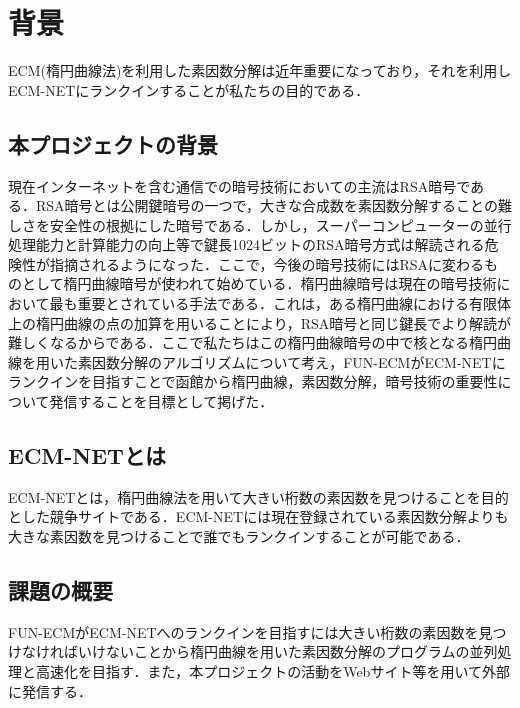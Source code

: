 \documentclass[openany,11pt,papersize]{jsbook}
\begin{document}
\tableofcontents%

\mainmatter%

\chapter{背景}

ECM(楕円曲線法)を利用した素因数分解は近年重要になっており，それを利用しECM-NETにランクインすることが私たちの目的である．


\section{本プロジェクトの背景}

現在インターネットを含む通信での暗号技術においての主流はRSA暗号である．RSA暗号とは公開鍵暗号の一つで，大きな合成数を素因数分解することの難しさを安全性の根拠にした暗号である．しかし，スーパーコンピューターの並行処理能力と計算能力の向上等で鍵長1024ビットのRSA暗号方式は解読される危険性が指摘されるようになった．ここで，今後の暗号技術にはRSAに変わるものとして楕円曲線暗号が使われて始めている．楕円曲線暗号は現在の暗号技術において最も重要とされている手法である．これは，ある楕円曲線における有限体上の楕円曲線の点の加算を用いることにより，RSA暗号と同じ鍵長でより解読が難しくなるからである．ここで私たちはこの楕円曲線暗号の中で核となる楕円曲線を用いた素因数分解のアルゴリズムについて考え，FUN-ECMがECM-NETにランクインを目指すことで函館から楕円曲線，素因数分解，暗号技術の重要性について発信することを目標として掲げた．


\section{ECM-NETとは}

ECM-NETとは，楕円曲線法を用いて大きい桁数の素因数を見つけることを目的とした競争サイトである．ECM-NETには現在登録されている素因数分解よりも大きな素因数を見つけることで誰でもランクインすることが可能である．


\section{課題の概要}\label{sec:gaiyou}

FUN-ECMがECM-NETへのランクインを目指すには大きい桁数の素因数を見つけなければいけないことから楕円曲線を用いた素因数分解のプログラムの並列処理と高速化を目指す．また，本プロジェクトの活動をWebサイト等を用いて外部に発信する．
\end{document}
